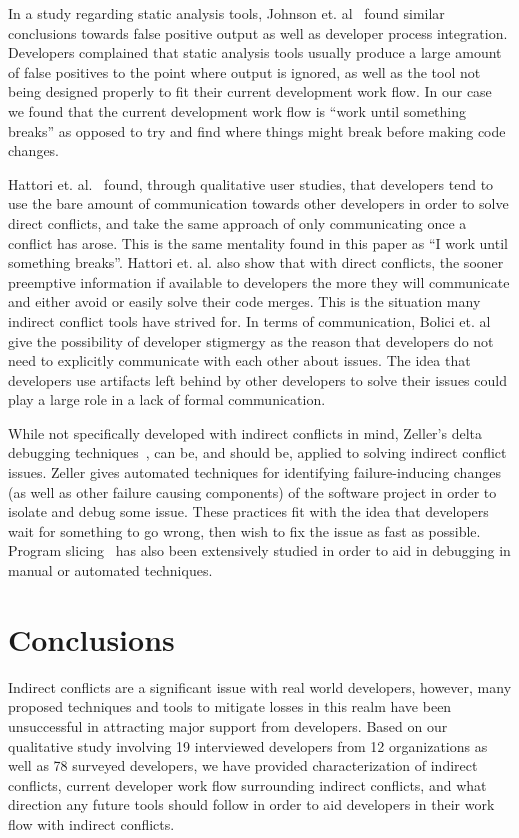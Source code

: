 \documentclass[conference]{IEEEtran}
\begin{document}
In a study regarding static analysis tools, Johnson et. al~\cite{Johnson:2013:WDS} found similar conclusions towards false positive output
as well as developer process integration. Developers complained that static analysis tools usually produce a large amount of false
positives to the point where output is ignored, as well as the tool not being designed properly to fit their current development work
flow. In our case we found that the current development work flow is ``work until something breaks'' as opposed to try and find where things
might break before making code changes.

Hattori et. al.~\cite{Hattori:2012:ICG} found, through qualitative user studies, that developers tend to use the bare amount of communication
towards other developers in order to solve direct conflicts, and take the same approach of only communicating once a conflict has arose. This
is the same mentality found in this paper as ``I work until something breaks''. Hattori et. al. also show that with direct conflicts, the
sooner preemptive information if available to developers the more they will communicate and either avoid or easily solve their code merges.
This is the situation many indirect conflict tools have strived for. In terms of communication, Bolici et. al~\cite{Bolici:2009} give the 
possibility of developer stigmergy as the reason that developers do not need to explicitly communicate with each other about issues. The idea
that developers use artifacts left behind by other developers to solve their issues could play a large role in a lack of formal communication.

While not specifically developed with indirect conflicts in mind, Zeller's delta debugging techniques~\cite{Zeller:2005:WPF}, 
can be, and should be, applied to solving indirect conflict issues. Zeller gives automated techniques for identifying failure-inducing
changes (as well as other failure causing components) of the software project in order to isolate and debug some issue. These practices fit
with the idea that developers wait for something to go wrong, then wish to fix the issue as fast as possible. Program slicing~\cite{Xu:2005:BSP}
has also been extensively studied in order to aid in debugging in manual or automated techniques.

\section{Conclusions}
\label{sec:conc}

Indirect conflicts are a significant issue with real world developers, however, many proposed techniques and tools to mitigate
losses in this realm have been unsuccessful in attracting major support from developers. Based on our qualitative study involving
19 interviewed developers from 12 organizations as well as 78 surveyed developers, we have provided characterization of indirect conflicts,
current developer work flow surrounding indirect conflicts, and what direction any future tools should follow in order to aid developers
in their work flow with indirect conflicts.
\end{document}
